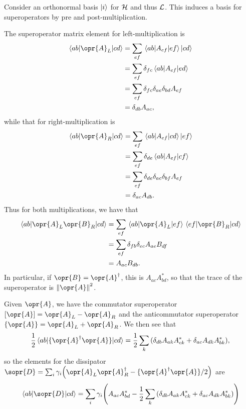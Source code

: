 \documentclass[../thesis.tex]{subfiles}
\begin{document}
Consider an orthonormal basis $\ket{i}$ for $\mathcal{H}$ and thus $\mathcal{L}$. This
induces a basis for superoperators by pre and post-multiplication.

The superoperator matrix element for left-multiplication is
\begin{align}
  \mel{ab}{\opr{A}_L}{cd}
  &= \sum_{ef} \mel{ab}{A_{ef}}{ef}\ket{cd} \\
  &= \sum_{ef} \delta_{fc} \mel{ab}{A_{ef}}{ed} \\
  &= \sum_{ef} \delta_{fc} \delta_{ae} \delta_{bd} A_{ef} \\
  &= \delta_{db} A_{ac},
\end{align}
while that for right-multiplication is
\begin{align}
  \mel{ab}{\opr{A}_R}{cd}
  &= \sum_{ef} \mel{ab}{A_{ef}}{cd}\ket{ef} \\
  &= \sum_{ef} \delta_{de} \mel{ab}{A_{ef}}{cf} \\
  &= \sum_{ef} \delta_{de} \delta_{ac} \delta_{bf} A_{ef} \\
  &= \delta_{ac} A_{db}.
\end{align}
Thus for both multiplications, we have that
\begin{align}
  \mel{ab}{\opr{A}_L\opr{B}_R}{cd}
  &= \sum_{ef} \mel{ab}{\opr{A}_L}{ef}\mel{ef}{\opr{B}_R}{cd} \\
  &= \sum_{ef} \delta_{fb} \delta_{ec} A_{ae} B_{df} \\
  &= A_{ac} B_{db}.
\end{align}
In particular, if $\opr{B} = \opr{A}^\dag$, this is $A_{ac} A_{bd}^*$, so that
the trace of the superoperator is $\norm{\opr{A}}^2$.

Given $\opr{A}$, we have the commutator superoperator $[\opr{A}] = \opr{A}_L -
\opr{A}_R$ and the anticommutator superoperator $\{\opr{A}\} = \opr{A}_L +
\opr{A}_R$. We then see that
\begin{equation}
  \frac{1}{2}\mel{ab}{\{\opr{A}^\dag \opr{A}\}}{cd}
  = \frac{1}{2}\sum_k\qty(\delta_{db} A_{ak}A_{ck}^* + \delta_{ac} A_{dk}A_{bk}^*),
\end{equation}
so the elements for the dissipator $\sopr{D} = \sum_i \gamma_i\qty(\opr{A}_L
\opr{A}_R^\dag - \{\opr{A}^\dag \opr{A}\}/2)$ are
\begin{equation}
  \mel{ab}{\sopr{D}}{cd}
  = \sum_i \gamma_i \qty(A_{ac}A_{bd}^* - \frac{1}{2}\sum_k\qty(\delta_{db} A_{ak}A_{ck}^* + \delta_{ac} A_{dk}A_{bk}^*))
\end{equation}


\end{document}
